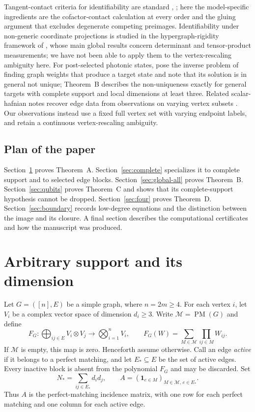 \documentclass[11pt]{article}
\theoremstyle{remark}\newtheorem{remark}[theorem]{Remark}
\newcommand{\PM}{\operatorname{PM}}
\begin{document}
Tangent-contact criteria for identifiability are standard \cite[Proposition~2.4]{co}, \cite[Proposition~8]{ballico}; here the model-specific ingredients are the cofactor-contact calculation at every order and the gluing argument that excludes degenerate competing preimages. Identifiability under non-generic coordinate projections is studied in the hypergraph-rigidity framework of \cite{cmnt}, whose main global results concern determinant and tensor-product measurements; we have not been able to apply them to the vertex-rescaling ambiguity here. For post-selected photonic states, \cite{bsl} pose the inverse problem of finding graph weights that produce a target state and note that its solution is in general not unique; Theorem~B describes the non-uniqueness exactly for general targets with complete support and local dimensions at least three. Related scalar-hafnian notes recover edge data from observations on varying vertex subsets \cite{repo-four,repo-star}. Our observations instead use a fixed full vertex set with varying endpoint labels, and retain a continuous vertex-rescaling ambiguity.

\subsection*{Plan of the paper}
Section~\ref{sec:arbitrary} proves Theorem~A. Section~\ref{sec:complete} specializes it to complete support and to selected edge blocks. Section~\ref{sec:global-all} proves Theorem~B. Section~\ref{sec:qubits} proves Theorem~C and shows that its complete-support hypothesis cannot be dropped. Section~\ref{sec:four} proves Theorem~D. Section~\ref{sec:boundary} records low-degree equations and the distinction between the image and its closure. A final section describes the computational certificates and how the manuscript was produced.


\section{Arbitrary support and its dimension}\label{sec:arbitrary}

Let $G=([n],E)$ be a simple graph, where $n=2m\geq4$.
For each vertex $i$, let $V_i$ be a complex vector space of dimension
$d_i\geq3$. Write $\mathcal M=\PM(G)$ and define
\[
 F_G:\bigoplus_{ij\in E}V_i\otimes V_j\longrightarrow
 \bigotimes_{i=1}^n V_i,\qquad
 F_G(W)=\sum_{M\in\mathcal M}\prod_{ij\in M}W_{ij}.
\]
If $\mathcal M$ is empty, this map is zero. Henceforth assume otherwise.
Call an edge \emph{active} if it belongs to a perfect matching, and let
$E_*\subseteq E$ be the set of active edges. Every inactive block is
absent from the polynomial $F_G$ and may be discarded. Set
\[
 N_* = \sum_{ij\in E_*}d_i d_j,
 \qquad A=(\mathbf1_{e\in M})_{M\in\mathcal M,\,e\in E_*}.
\]
Thus $A$ is the perfect-matching incidence matrix, with one row for
each perfect matching and one column for each active edge.
\end{document}
